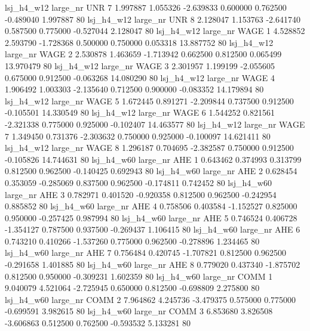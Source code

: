   lsj_h4_w12   large_nr      UNR                 7  1.997887  1.055326  -2.639833 0.600000 0.762500 -0.489040    1.997887 80
  lsj_h4_w12   large_nr      UNR                 8  2.128047  1.153763  -2.641740 0.587500 0.775000 -0.527044    2.128047 80
  lsj_h4_w12   large_nr     WAGE                 1  4.528852  2.593790  -1.728368 0.500000 0.750000  0.053318   13.887752 80
  lsj_h4_w12   large_nr     WAGE                 2  2.530878  1.463659  -1.713942 0.662500 0.812500  0.065499   13.970479 80
  lsj_h4_w12   large_nr     WAGE                 3  2.301957  1.199199  -2.055605 0.675000 0.912500 -0.063268   14.080290 80
  lsj_h4_w12   large_nr     WAGE                 4  1.906492  1.003303  -2.135640 0.712500 0.900000 -0.083352   14.179894 80
  lsj_h4_w12   large_nr     WAGE                 5  1.672445  0.891271  -2.209844 0.737500 0.912500 -0.105501   14.330549 80
  lsj_h4_w12   large_nr     WAGE                 6  1.544252  0.821561  -2.321338 0.775000 0.925000 -0.102407   14.463577 80
  lsj_h4_w12   large_nr     WAGE                 7  1.349450  0.731376  -2.303632 0.750000 0.925000 -0.100097   14.621411 80
  lsj_h4_w12   large_nr     WAGE                 8  1.296187  0.704695  -2.382587 0.750000 0.912500 -0.105826   14.744631 80
  lsj_h4_w60   large_nr      AHE                 1  0.643462  0.374993   0.313799 0.812500 0.962500 -0.140425    0.692943 80
  lsj_h4_w60   large_nr      AHE                 2  0.628454  0.353059  -0.285069 0.837500 0.962500 -0.174811    0.742452 80
  lsj_h4_w60   large_nr      AHE                 3  0.782971  0.401520  -0.920358 0.812500 0.962500 -0.242954    0.885852 80
  lsj_h4_w60   large_nr      AHE                 4  0.758506  0.403584  -1.152527 0.825000 0.950000 -0.257425    0.987994 80
  lsj_h4_w60   large_nr      AHE                 5  0.746524  0.406728  -1.354127 0.787500 0.937500 -0.269437    1.106415 80
  lsj_h4_w60   large_nr      AHE                 6  0.743210  0.410266  -1.537260 0.775000 0.962500 -0.278896    1.234465 80
  lsj_h4_w60   large_nr      AHE                 7  0.756484  0.420745  -1.707821 0.812500 0.962500 -0.291658    1.401885 80
  lsj_h4_w60   large_nr      AHE                 8  0.779020  0.437340  -1.875702 0.812500 0.950000 -0.309231    1.602359 80
  lsj_h4_w60   large_nr     COMM                 1  9.040079  4.521064  -2.725945 0.650000 0.812500 -0.698809    2.275800 80
  lsj_h4_w60   large_nr     COMM                 2  7.964862  4.245736  -3.479375 0.575000 0.775000 -0.699591    3.982615 80
  lsj_h4_w60   large_nr     COMM                 3  6.853680  3.826508  -3.606863 0.512500 0.762500 -0.593532    5.133281 80
